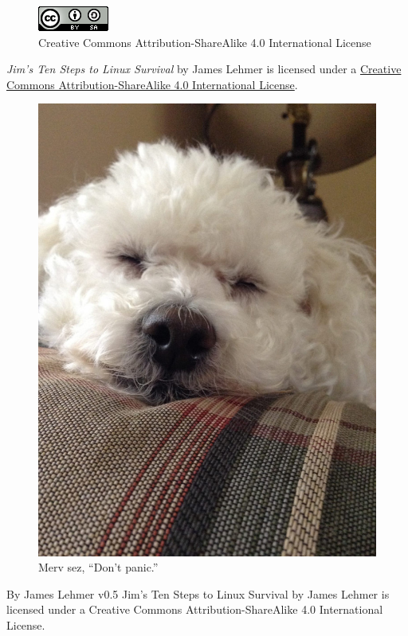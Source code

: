 \documentclass[10pt,]{book}
\numberwithin{figure}{chapter}
\begin{document}
\begin{figure}[!htbp]
\centering
\includegraphics{./images/cc-by-sa.png}
\caption*{Creative Commons Attribution-ShareAlike 4.0 International License}
\end{figure}

\emph{Jim's Ten Steps to Linux Survival} by James Lehmer is licensed
under a \href{http://creativecommons.org/licenses/by-sa/4.0/}{Creative
Commons Attribution-ShareAlike 4.0 International License}.
\pagestyle{headings} \else

\begin{figure}[htbp]
\centering
\includegraphics{./images/Merv.jpg}
\caption{Merv sez, ``Don't panic.''}
\end{figure}

By James Lehmer v0.5 {Jim's Ten Steps to Linux Survival} by {James
Lehmer} is licensed under a Creative Commons Attribution-ShareAlike 4.0
International License.
\end{document}
